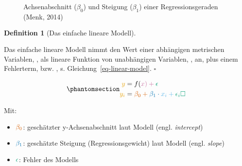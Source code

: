 \documentclass[
  letterpaper,
]{scrbook}
\providecommand{\tightlist}{%
  \setlength{\itemsep}{0pt}\setlength{\parskip}{0pt}}\usepackage{longtable,booktabs,array}
\theoremstyle{definition}
\theoremstyle{definition}
\theoremstyle{definition}
\newtheorem{definition}{Definition}[chapter]
\theoremstyle{remark}
\begin{document}
\begin{figure}


\caption{\label{fig-regrtex}Achsenabschnitt (\(\beta_0\)) und Steigung
(\(\beta_1\)) einer Regressionsgeraden (Menk, 2014)}

\end{figure}%

\begin{definition}[Das einfache lineare
Modell]\protect\hypertarget{def-einfache-lineare-modell}{}\label{def-einfache-lineare-modell}

Das einfache lineare Modell nimmt den Wert einer abhängigen metrischen
Variablen, \color{ycol}{y}, als lineare Funktion von unabhängigen
Variablen, \color{xcol}{x}, an, plus einem Fehlerterm,
\color{errorcol}{e} bzw. \color{errorcol}{$\epsilon$}, s.
Gleichung~\ref{eq-linear-model}. \(\square\)

\end{definition}

\begin{equation}\phantomsection\label{eq-linear-model}{\begin{aligned}
\color{ycol}{y} &= f(\color{xcol}{x}) + \color{errorcol}{\epsilon} \\
\color{ycol}{y_i} &= \color{beta0col}{\beta_0} + \color{beta1col}{\beta_1} \cdot \color{modelcol}{x_i} + \color{errorcol}{\epsilon_i} \square
\end{aligned}}\end{equation}

Mit:

\begin{itemize}
\tightlist
\item
  \(\color{beta0col}{\beta_0}\): geschätzter y-Achsenabschnitt laut
  Modell (engl. \emph{intercept})
\item
  \(\color{beta1col}{\beta_1}\): geschätzte Steigung
  (Regressionsgewicht) laut Modell (engl. \emph{slope})
\item
  \(\color{errorcol}{\epsilon}\): Fehler des Modells
\end{itemize}
\end{document}
